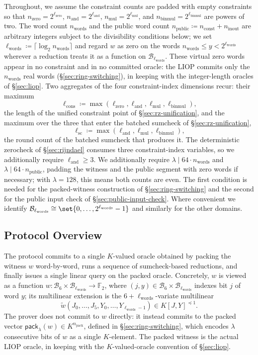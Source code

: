\documentclass{article}
\theoremstyle{definition}
\newcommand*{\mlin}{{\preceq 1}}
\newcommand*{\mle}{\widetilde}
\newcommand{\BB}{\mathcal{B}}
\newcommand{\FF}[1]{\mathbb{F}_{#1}}
\begin{document}
Throughout, we assume the constraint counts are padded with empty constraints so that $n_\text{zero} = 2^{\ell_\text{zero}}$, $n_\text{and} = 2^{\ell_\text{and}}$, $n_\text{mul} = 2^{\ell_\text{mul}}$, and $n_\text{binmul} = 2^{\ell_\text{binmul}}$ are powers of two. The word count $n_\text{words}$ and the public word count $n_\text{public} \coloneqq n_\text{const} + n_\text{inout}$ are arbitrary integers subject to the divisibility conditions below; we set $\ell_\text{words} \coloneqq \lceil \log_2 n_\text{words} \rceil$ and regard $w$ as zero on the words $n_\text{words} \le y < 2^{\ell_\text{words}}$ wherever a reduction treats it as a function on $\BB_{\ell_\text{words}}$. These virtual zero words appear in no constraint and in no committed oracle: the LIOP commits only the $n_\text{words}$ real words (\S\ref{sec:ring-switching}), in keeping with the integer-length oracles of \S\ref{sec:liop}. Two aggregates of the four constraint-index dimensions recur: their maximum
\[
  \ell_\text{cons} \coloneqq \max(\ell_\text{zero}, \ell_\text{and}, \ell_\text{mul}, \ell_\text{binmul}),
\]
the length of the unified constraint point of \S\ref{sec:rz-unification}, and the maximum over the three that enter the batched sumcheck of \S\ref{sec:rz-unification},
\[
  \ell_\text{sc} \coloneqq \max(\ell_\text{and}, \ell_\text{mul}, \ell_\text{binmul}),
\]
the round count of the batched sumcheck that produces it. The deterministic zerocheck of \S\ref{sec:rijndael} consumes three constraint-index variables, so we additionally require $\ell_\text{and} \geq 3$. We additionally require $\lambda \mid 64 \cdot n_\text{words}$ and $\lambda \mid 64 \cdot n_\text{public}$, padding the witness and the public segment with zero words if necessary; with $\lambda = 128$, this means both counts are even. The first condition is needed for the packed-witness construction of \S\ref{sec:ring-switching} and the second for the public input check of \S\ref{sec:public-input-check}. Where convenient we identify $\BB_{\ell_\text{words}} \cong \set{0, \ldots, 2^{\ell_\text{words}} - 1}$ and similarly for the other domains.

\subsection{Protocol Overview}
\label{sec:protocol-overview}

The protocol commits to a single $K$-valued oracle obtained by packing the witness $w$ word-by-word, runs a sequence of sumcheck-based reductions, and finally issues a single linear query on the packed oracle. Concretely, $w$ is viewed as a function $w \colon \BB_6 \times \BB_{\ell_\text{words}} \to \FF{2}$, where $(j, y) \in \BB_6 \times \BB_{\ell_\text{words}}$ indexes bit $j$ of word $y$; its multilinear extension is the $6 + \ell_\text{words}$-variate multilinear
\[
  \mle{w}(J_0, \ldots, J_5, Y_0, \ldots, Y_{\ell_\text{words} - 1}) \in K[J, Y]^\mlin.
\]
The prover does not commit to $w$ directly: it instead commits to the packed vector $\textsf{pack}_\lambda(w) \in K^{n_\text{pack}}$, defined in \S\ref{sec:ring-switching}, which encodes $\lambda$ consecutive bits of $w$ as a single $K$-element. The packed witness is the actual LIOP oracle, in keeping with the $K$-valued-oracle convention of \S\ref{sec:liop}.
\end{document}
